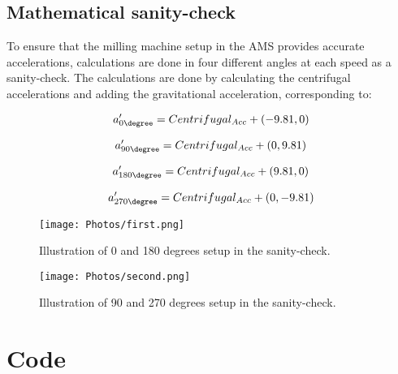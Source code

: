     \subsection{Mathematical sanity-check}
    
        To ensure that the milling machine setup in the AMS provides accurate accelerations, calculations are done in four different angles at each speed as a sanity-check. The calculations are done by calculating the centrifugal accelerations and adding the gravitational acceleration, corresponding to: \newline
        
        \begin{equation} \label{0}
            a'_{0\degree} = Centrifugal_{Acc}+(-9.81,0)
        \end{equation}
        
        \begin{equation} \label{0}
            a'_{90\degree} = Centrifugal_{Acc}+(0,9.81)
        \end{equation}
        
        \begin{equation} \label{0}
            a'_{180\degree} = Centrifugal_{Acc}+(9.81,0)
        \end{equation}
        
        \begin{equation} \label{0}
            a'_{270\degree} = Centrifugal_{Acc}+(0,-9.81)
        \end{equation}

\begin{figure}[h!]
    \centering
    \texttt{[image: Photos/first.png]}
    \caption{Illustration of 0 and 180 degrees setup in the sanity-check.}
    \label{fig:my_label}
\end{figure}

\begin{figure}[h!]
    \centering
    \texttt{[image: Photos/second.png]}
    \caption{Illustration of 90 and 270 degrees setup in the sanity-check.}
    \label{fig:my_label}
\end{figure}
\newpage


\section{Code}
